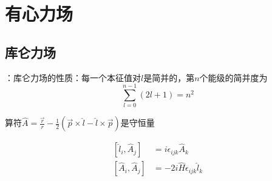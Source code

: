 \documentclass[12pt, a4paper, oneside]{ctexbook}
\newcommand{\hl}[1]{\hlbox{#1}}
\newcounter{#2}
\newcounter{#2}[#1]
\numberwithin{#2}{#1}
\newcommand{\com}[2]{\left[#1,#2\right]}
\newcommand{\akuo}[1]{\left[#1\right]}
\newcommand{\ep}[1]{\epsilon_{#1}}%
\begin{document}
            \chapter{有心力场}
            \section{库仑力场}
            \begin{attr}
                \hl{库仑简并}：库仑力场的性质：每一个本征值对\(l\)是简并的，第\(n\)个能级的简并度为
                \begin{equation}
                    \sum_{l=0}^{n-1}(2l+1)=n^2
                \end{equation}
            \end{attr}
            \begin{theorem}
                算符\(\hat A=\frac{\vec r} r-\frac12(\vec p\times\hat l-\hat l\times \vec p)\)是守恒量
            \end{theorem}
            \begin{commute}
                \begin{align}
                    \akuo{\hat l_i,\hat A_j}&=i\epsilon_{ijk}\hat A_k\\
                    \com{\hat A_i}{\hat A_j}&=-2i\hat H\ep{ijk}\hat l_k
                \end{align}
            \end{commute} 
\end{document}
